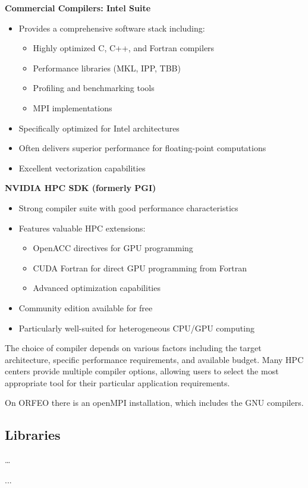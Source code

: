 \textbf{Commercial Compilers: Intel Suite}
\begin{itemize}
    \item Provides a comprehensive software stack including:
    \begin{itemize}
        \item Highly optimized C, C++, and Fortran compilers
        \item Performance libraries (MKL, IPP, TBB)
        \item Profiling and benchmarking tools
        \item MPI implementations
    \end{itemize}
    \item Specifically optimized for Intel architectures
    \item Often delivers superior performance for floating-point computations
    \item Excellent vectorization capabilities
\end{itemize}

\textbf{NVIDIA HPC SDK (formerly PGI)}
\begin{itemize}
    \item Strong compiler suite with good performance characteristics
    \item Features valuable HPC extensions:
    \begin{itemize}
        \item OpenACC directives for GPU programming
        \item CUDA Fortran for direct GPU programming from Fortran
        \item Advanced optimization capabilities
    \end{itemize}
    \item Community edition available for free
    \item Particularly well-suited for heterogeneous CPU/GPU computing
\end{itemize}

The choice of compiler depends on various factors including the target architecture, specific performance requirements, and available budget. Many HPC centers provide multiple compiler options, allowing users to select the most appropriate tool for their particular application requirements.

\begin{observationblock}
    On ORFEO there is an openMPI installation, which includes the GNU compilers.
\end{observationblock}

\subsection{Libraries}

\dots

...